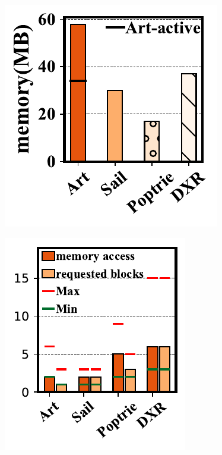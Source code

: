 \documentclass[a4paper]{article}
\begin{document}
    \begin{figure}[htbp]
        \includegraphics{../result/example7.pdf}
    \end{figure}

    \begin{figure}[htbp]
        \includegraphics{../result/example8.pdf}
    \end{figure}
\end{document}
